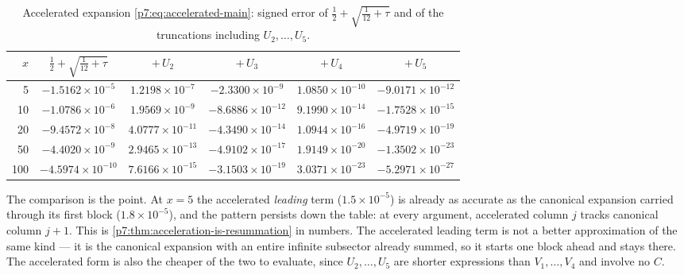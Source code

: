 \documentclass[11pt,a4paper,oneside]{book}
\theoremstyle{plain}
\theoremstyle{definition}
\theoremstyle{remark}
\begin{document}
\begin{table}[htbp]
\centering
\caption{Accelerated expansion \eqref{p7:eq:accelerated-main}: signed error of
$\tfrac12+\sqrt{\tfrac1{12}+\tau}$ and of the truncations including
$U_2,\dots,U_5$.}
\label{p7:tab:accelerated}
\scriptsize
\setlength{\tabcolsep}{4pt}
\begin{tabular}{rccccc}
\toprule
$x$ & $\tfrac12+\sqrt{\tfrac1{12}+\tau}$ & $+\,U_2$ & $+\,U_3$ & $+\,U_4$ & $+\,U_5$\\
\midrule
5 & $-1.5162\!\times\!10^{-5}$ & $1.2198\!\times\!10^{-7}$ & $-2.3300\!\times\!10^{-9}$ & $1.0850\!\times\!10^{-10}$ & $-9.0171\!\times\!10^{-12}$\\
10 & $-1.0786\!\times\!10^{-6}$ & $1.9569\!\times\!10^{-9}$ & $-8.6886\!\times\!10^{-12}$ & $9.1990\!\times\!10^{-14}$ & $-1.7528\!\times\!10^{-15}$\\
20 & $-9.4572\!\times\!10^{-8}$ & $4.0777\!\times\!10^{-11}$ & $-4.3490\!\times\!10^{-14}$ & $1.0944\!\times\!10^{-16}$ & $-4.9719\!\times\!10^{-19}$\\
50 & $-4.4020\!\times\!10^{-9}$ & $2.9465\!\times\!10^{-13}$ & $-4.9102\!\times\!10^{-17}$ & $1.9149\!\times\!10^{-20}$ & $-1.3502\!\times\!10^{-23}$\\
100 & $-4.5974\!\times\!10^{-10}$ & $7.6166\!\times\!10^{-15}$ & $-3.1503\!\times\!10^{-19}$ & $3.0371\!\times\!10^{-23}$ & $-5.2971\!\times\!10^{-27}$\\
\bottomrule
\end{tabular}
\end{table}

The comparison is the point.  At $x=5$ the accelerated \emph{leading} term
($1.5\times10^{-5}$) is already as accurate as the canonical expansion carried
through its first block ($1.8\times10^{-5}$), and the pattern persists down the
table: at every argument, accelerated column $j$ tracks canonical column
$j+1$.  This is \cref{p7:thm:acceleration-is-resummation} in numbers.  The
accelerated leading term is not a better approximation of the same kind --- it
is the canonical expansion with an entire infinite subsector already summed,
so it starts one block ahead and stays there.  The accelerated form is also
the cheaper of the two to evaluate, since $U_2,\dots,U_5$ are shorter
expressions than $V_1,\dots,V_4$ and involve no $C$.
\end{document}

